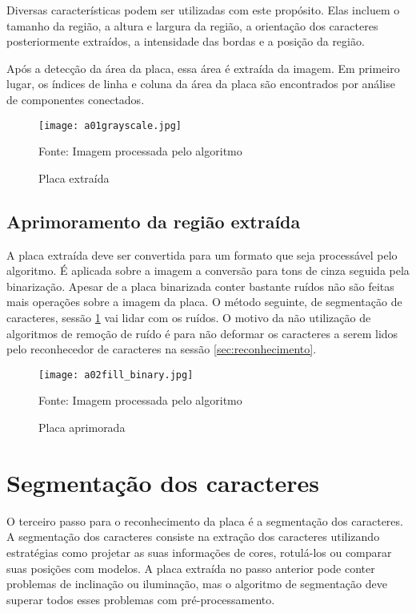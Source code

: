 Diversas características podem ser utilizadas com este propósito. Elas incluem o tamanho da região, a altura e largura da região, a orientação dos caracteres posteriormente extraídos, a intensidade das bordas e a posição da região.
 
Após a detecção da área da placa, essa área é extraída da imagem. Em primeiro lugar, os índices de linha e coluna da área da placa são encontrados por análise de componentes conectados.

\begin{figure}[H]
	\centering
	\texttt{[image: a01grayscale.jpg]}
	\caption{Placa extraída}
Fonte: Imagem processada pelo algoritmo
	\label{fig:ext_true_number_plate}
\end{figure}

\subsection{Aprimoramento da região extraída}

A placa extraída deve ser convertida para um formato que seja processável pelo algoritmo. É aplicada sobre a imagem a conversão para tons de cinza seguida pela binarização. Apesar de a placa binarizada conter bastante ruídos não são feitas mais operações sobre a imagem da placa. O método seguinte, de segmentação de caracteres, sessão \ref{sec:segmentacao} vai lidar com os ruídos. O motivo da não utilização de algoritmos de remoção de ruído é para não deformar os caracteres a serem lidos pelo reconhecedor de caracteres na sessão \ref{sec:reconhecimento}.

\begin{figure}[H]
	\centering
	\texttt{[image: a02fill\_binary.jpg]}
	\caption{Placa aprimorada}
Fonte: Imagem processada pelo algoritmo
	\label{fig:ext_enhanced_number_plate}
\end{figure}

\section{Segmentação dos caracteres}
\label{sec:segmentacao}

O terceiro passo para o reconhecimento da placa é a segmentação dos caracteres.
A segmentação dos caracteres consiste na extração dos caracteres utilizando
estratégias como projetar as suas informações de cores, rotulá-los ou comparar
suas posições com modelos. A placa extraída no passo anterior pode conter
problemas de inclinação ou iluminação, mas o algoritmo de segmentação deve
superar todos esses problemas com pré-processamento.~\cite{s2013automatic}

